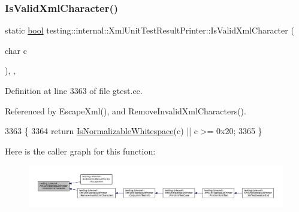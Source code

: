 \subsubsection{\texorpdfstring{Is\+Valid\+Xml\+Character()}{IsValidXmlCharacter()}}
{\footnotesize\ttfamily static \hyperlink{classbool}{bool} testing\+::internal\+::\+Xml\+Unit\+Test\+Result\+Printer\+::\+Is\+Valid\+Xml\+Character (\begin{DoxyParamCaption}\item[{char}]{c }\end{DoxyParamCaption})\hspace{0.3cm}{\ttfamily [inline]}, {\ttfamily [static]}, {\ttfamily [private]}}



Definition at line 3363 of file gtest.\+cc.



Referenced by Escape\+Xml(), and Remove\+Invalid\+Xml\+Characters().


\begin{DoxyCode}
3363                                           \{
3364     \textcolor{keywordflow}{return} \hyperlink{classtesting_1_1internal_1_1XmlUnitTestResultPrinter_af9d5af6e5d0c505d5c3bd50a8d2a8d76}{IsNormalizableWhitespace}(c) || c >= 0x20;
3365   \}
\end{DoxyCode}
Here is the caller graph for this function\+:
\nopagebreak
\begin{figure}[H]
\begin{center}
\leavevmode
\includegraphics[width=350pt]{classtesting_1_1internal_1_1XmlUnitTestResultPrinter_a2b83a24e3ec8544efa1156f9d6e51873_icgraph}
\end{center}
\end{figure}
\mbox{\label{classtesting_1_1internal_1_1XmlUnitTestResultPrinter_a2ae986dd2f4f2aed31cc6f3bc8c56898}} 

